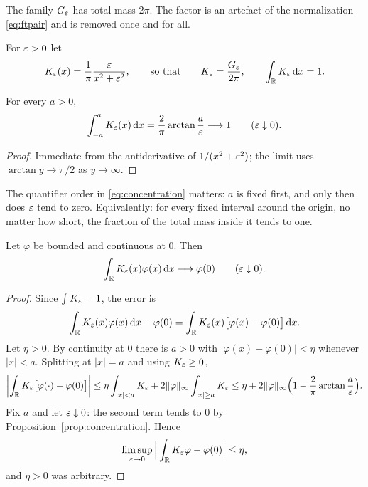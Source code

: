 The family $G_{\varepsilon}$ has total mass $2\pi$. The factor is an artefact of the normalization
\eqref{eq:ftpair} and is removed once and for all.

\begin{definition}\label{def:Keps}
For $\varepsilon>0$ let
\begin{equation}
K_{\varepsilon}(x)=\frac{1}{\pi}\frac{\varepsilon}{x^{2}+\varepsilon^{2}},
\qquad\text{so that}\qquad
K_{\varepsilon}=\frac{G_{\varepsilon}}{2\pi},\qquad \int_{\mathbb{R}}K_{\varepsilon}\,\mathrm{d} x=1 .
\label{eq:Keps}
\end{equation}
\end{definition}

\begin{proposition}\label{prop:concentration}
For every $a>0$,
\begin{equation}
\int_{-a}^{a}K_{\varepsilon}(x)\,\mathrm{d} x=\frac{2}{\pi}\arctan\frac{a}{\varepsilon}\longrightarrow1
\qquad(\varepsilon\downarrow0).
\label{eq:concentration}
\end{equation}
\end{proposition}

\begin{proof}
Immediate from the antiderivative of $1/(x^{2}+\varepsilon^{2})$; the limit uses
$\arctan y\to\pi/2$ as $y\to\infty$.
\end{proof}

The quantifier order in \eqref{eq:concentration} matters: $a$ is fixed first, and only then does
$\varepsilon$ tend to zero. Equivalently: for every fixed interval around the origin, no matter how short,
the fraction of the total mass inside it tends to one.

\begin{theorem}[sampling]\label{thm:sampling}
Let $\varphi$ be bounded and continuous at $0$. Then
\begin{equation}
\int_{\mathbb{R}}K_{\varepsilon}(x)\varphi(x)\,\mathrm{d} x\longrightarrow\varphi(0)
\qquad(\varepsilon\downarrow0).
\label{eq:sampling}
\end{equation}
\end{theorem}

\begin{proof}
Since $\int K_{\varepsilon}=1$, the error is
\begin{equation}
\int_{\mathbb{R}}K_{\varepsilon}(x)\varphi(x)\,\mathrm{d} x-\varphi(0)
=\int_{\mathbb{R}}K_{\varepsilon}(x)\big[\varphi(x)-\varphi(0)\big]\,\mathrm{d} x .
\end{equation}
Let $\eta>0$. By continuity at $0$ there is $a>0$ with $|\varphi(x)-\varphi(0)|<\eta$ whenever
$|x|<a$. Splitting at $|x|=a$ and using $K_{\varepsilon}\ge0$,
\begin{equation}
\left|\int_{\mathbb{R}}K_{\varepsilon}\big[\varphi(\cdot)-\varphi(0)\big]\right|
\le\eta\int_{|x|<a}K_{\varepsilon}
+2\|\varphi\|_{\infty}\int_{|x|\ge a}K_{\varepsilon}
\le\eta+2\|\varphi\|_{\infty}\Big(1-\frac{2}{\pi}\arctan\frac{a}{\varepsilon}\Big).
\end{equation}
Fix $a$ and let $\varepsilon\downarrow0$: the second term tends to $0$ by
Proposition~\ref{prop:concentration}. Hence
\begin{equation}
\limsup_{\varepsilon\to0}\Big|\int_{\mathbb{R}}K_{\varepsilon}\varphi-\varphi(0)\Big|\le\eta ,
\end{equation}
and $\eta>0$ was arbitrary.
\end{proof}

